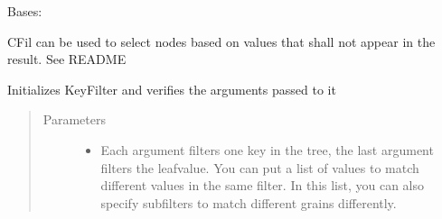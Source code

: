 \documentclass[a4paper,10pt,english]{sphinxmanual}
\begin{document}
\begin{fulllineitems}
\label{\detokenize{fagus:fagus.CFil}}
\pysigstartsignatures
{}
\pysigstopsignatures
\sphinxAtStartPar
Bases: {\hyperref[\detokenize{fagus.filters:fagus.filters.KFil}]{}}

\sphinxAtStartPar
CFil \sphinxhyphen{} can be used to select nodes based on values that shall not appear in the result. See README

\begin{fulllineitems}
\label{\detokenize{fagus:fagus.CFil.__init__}}
\pysigstartsignatures
{}
\pysigstopsignatures
\sphinxAtStartPar
Initializes KeyFilter and verifies the arguments passed to it
\begin{quote}\begin{description}
\item[{Parameters}] \leavevmode\begin{itemize}
\item {}
\sphinxAtStartPar
{} \textendash{} Each argument filters one key in the tree, the last argument filters the leaf\sphinxhyphen{}value. You can
put a list of values to match different values in the same filter. In this list, you can also specify
subfilters to match different grains differently.


\end{itemize}
\end{description}
\end{quote}
\end{fulllineitems}
\end{fulllineitems}
\end{document}

